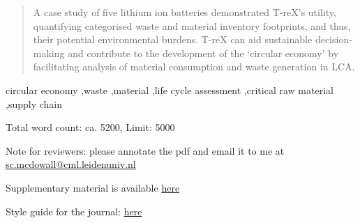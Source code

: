 \documentclass[review,3p,authoryear]{elsarticle}
\newcommand{\cbox}[1]{
    \begin{tcolorbox}[hbox, colback=red!5!white, colframe=red!65!black, boxrule=0.25pt, boxsep=2pt, left=2pt, right=2pt, top=1pt, bottom=1pt]
        \small\sffamily #1
    \end{tcolorbox}
}
\begin{document}
\begin{frontmatter}
\begin{abstract}
        A case study of five lithium ion batteries demonstrated T-reX's utility, quantifying categorised waste and material inventory footprints, and thus, their potential environmental burdens. T-reX can aid sustainable decision-making and contribute to the development of the `circular economy' by facilitating analysis of material consumption and waste generation in LCA.

    \end{abstract}


    \begin{keyword}
        circular economy \sep waste \sep material \sep life cycle assessment \sep critical raw material \sep supply chain
    \end{keyword}

\end{frontmatter}
\cbox{Total word count: ca. 5200, Limit: 5000}
\cbox{Note for reviewers: please annotate the pdf and email it to me at \href{mailto:sc.mcdowall@cml.leidenuniv.nl}{sc.mcdowall@cml.leidenuniv.nl}}
\cbox{Supplementary material is available \href{https://github.com/Stew-McD/T-reX_Publication/blob/main/reviews/T-reX_Manuscript_V2/T-reX_manuscript_V2_SupplementaryMaterial.pdf}{here}}
\cbox{Style guide for the journal: \href{https://www.sciencedirect.com/journal/resources-conservation-and-recycling/publish/guide-for-authors}{here}}
\end{document}
